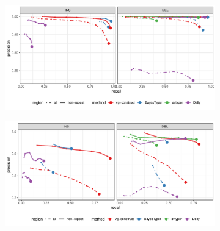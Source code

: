 \documentclass{article}
\begin{document}
\clearpage
\begin{figure}
  \begin{subfigure}[b]{\textwidth}
    \caption{}
    \includegraphics[width=\textwidth]{pdf/hgsvc-sim.pdf}
  \end{subfigure}

  \begin{subfigure}[b]{\textwidth}
    \caption{}
    \includegraphics[width=\textwidth]{pdf/hgsvc-real.pdf}
  \end{subfigure}
\end{figure}
\end{document}
